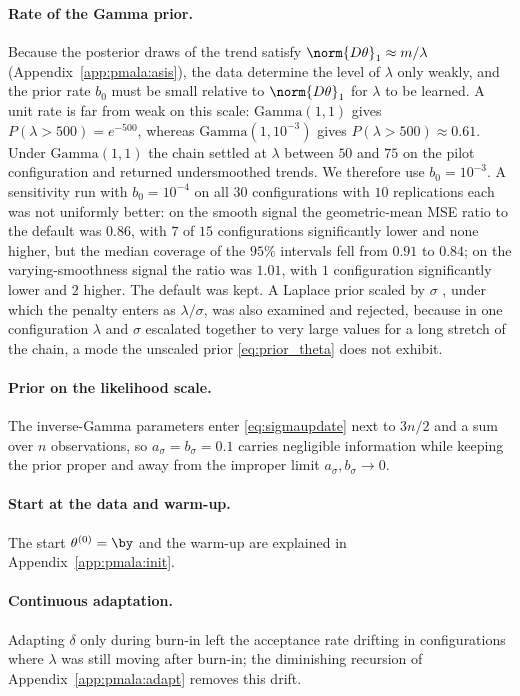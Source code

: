 \paragraph{Rate of the Gamma prior.} Because the posterior draws of the trend satisfy $\norm{D\theta}_1 \approx m/\lambda$ (Appendix~\ref{app:pmala:asis}), the data determine the level of $\lambda$ only weakly, and the prior rate $b_0$ must be small relative to $\norm{D\theta}_1$ for $\lambda$ to be learned. A unit rate is far from weak on this scale: $\mathrm{Gamma}(1,1)$ gives $P(\lambda > 500) = e^{-500}$, whereas $\mathrm{Gamma}(1, 10^{-3})$ gives $P(\lambda > 500) \approx 0.61$. Under $\mathrm{Gamma}(1,1)$ the chain settled at $\lambda$ between $50$ and $75$ on the pilot configuration and returned undersmoothed trends. We therefore use $b_0 = 10^{-3}$. A sensitivity run with $b_0 = 10^{-4}$ on all $30$ configurations with $10$ replications each was not uniformly better: on the smooth signal the geometric-mean MSE ratio to the default was $0.86$, with $7$ of $15$ configurations significantly lower and none higher, but the median coverage of the $95\%$ intervals fell from $0.91$ to $0.84$; on the varying-smoothness signal the ratio was $1.01$, with $1$ configuration significantly lower and $2$ higher. The default was kept. A Laplace prior scaled by $\sigma$ \citep{park2008bayesian}, under which the penalty enters as $\lambda/\sigma$, was also examined and rejected, because in one configuration $\lambda$ and $\sigma$ escalated together to very large values for a long stretch of the chain, a mode the unscaled prior \eqref{eq:prior_theta} does not exhibit.

\paragraph{Prior on the likelihood scale.} The inverse-Gamma parameters enter \eqref{eq:sigmaupdate} next to $3n/2$ and a sum over $n$ observations, so $a_\sigma = b_\sigma = 0.1$ carries negligible information while keeping the prior proper and away from the improper limit $a_\sigma, b_\sigma \to 0$.

\paragraph{Start at the data and warm-up.} The start $\theta^{(0)} = \by$ and the warm-up are explained in Appendix~\ref{app:pmala:init}.

\paragraph{Continuous adaptation.} Adapting $\delta$ only during burn-in left the acceptance rate drifting in configurations where $\lambda$ was still moving after burn-in; the diminishing recursion of Appendix~\ref{app:pmala:adapt} removes this drift.

